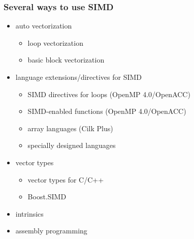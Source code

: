 \documentclass[12pt,dvipdfmx]{beamer}
\newcommand{\ao}[1]{{\color{blue}#1}}
\begin{document}
\begin{frame}[fragile]
\frametitle{Several ways to use SIMD}

\begin{itemize}
\item auto vectorization
  \begin{itemize}
  \item \ao{loop vectorization}
  \item basic block vectorization
  \end{itemize}

\item language extensions/directives for SIMD
  \begin{itemize}
  \item \ao{SIMD directives for loops (OpenMP 4.0/OpenACC)}
  \item \ao{SIMD-enabled functions (OpenMP 4.0/OpenACC)}
  \item array languages (Cilk Plus)
  \item specially designed languages
  \end{itemize}

\item vector types
  \begin{itemize}
  \item \ao{vector types for C/C++}
  \item Boost.SIMD
  \end{itemize}

\item \ao{intrinsics} 

\item assembly programming
\end{itemize}

\end{frame}

\end{document}
